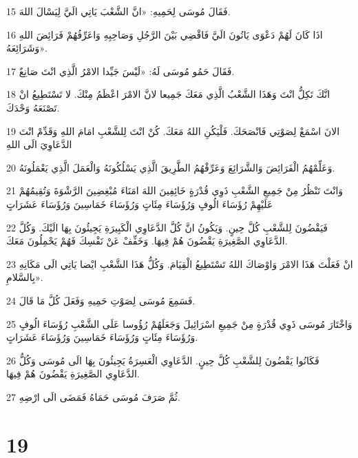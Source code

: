 \par 15 فَقَالَ مُوسَى لِحَمِيهِ: «انَّ الشَّعْبَ يَاتِي الَيَّ لِيَسْالَ اللهَ.
\par 16 اذَا كَانَ لَهُمْ دَعْوَى يَاتُونَ الَيَّ فَاقْضِي بَيْنَ الرَّجُلِ وَصَاحِبِهِ وَاعَرِّفُهُمْ فَرَائِضَ اللهِ وَشَرَائِعَهُ».
\par 17 فَقَالَ حَمُو مُوسَى لَهُ: «لَيْسَ جَيِّدا الامْرُ الَّذِي انْتَ صَانِعٌ.
\par 18 انَّكَ تَكِلُّ انْتَ وَهَذَا الشَّعْبُ الَّذِي مَعَكَ جَمِيعا لانَّ الامْرَ اعْظَمُ مِنْكَ. لا تَسْتَطِيعُ انْ تَصْنَعَهُ وَحْدَكَ.
\par 19 الانَ اسْمَعْ لِصَوْتِي فَانْصَحَكَ. فَلْيَكُنِ اللهُ مَعَكَ. كُنْ انْتَ لِلشَّعْبِ امَامَ اللهِ وَقَدِّمْ انْتَ الدَّعَاوِيَ الَى اللهِ
\par 20 وَعَلِّمْهُمُ الْفَرَائِضَ وَالشَّرَائِعَ وَعَرِّفْهُمُ الطَّرِيقَ الَّذِي يَسْلُكُونَهُ وَالْعَمَلَ الَّذِي يَعْمَلُونَهُ.
\par 21 وَانْتَ تَنْظُرُ مِنْ جَمِيعِ الشَّعْبِ ذَوِي قُدْرَةٍ خَائِفِينَ اللهَ امَنَاءَ مُبْغِضِينَ الرَّشْوَةَ وَتُقِيمُهُمْ عَلَيْهِمْ رُؤَسَاءَ الُوفٍ وَرُؤَسَاءَ مِئَاتٍ وَرُؤَسَاءَ خَمَاسِينَ وَرُؤَسَاءَ عَشَرَاتٍ
\par 22 فَيَقْضُونَ لِلشَّعْبِ كُلَّ حِينٍ. وَيَكُونُ انَّ كُلَّ الدَّعَاوِي الْكَبِيرَةِ يَجِيئُونَ بِهَا الَيْكَ. وَكُلَّ الدَّعَاوِي الصَّغِيرَةِ يَقْضُونَ هُمْ فِيهَا. وَخَفِّفْ عَنْ نَفْسِكَ فَهُمْ يَحْمِلُونَ مَعَكَ.
\par 23 انْ فَعَلْتَ هَذَا الامْرَ وَاوْصَاكَ اللهُ تَسْتَطِيعُ الْقِيَامَ. وَكُلُّ هَذَا الشَّعْبِ ايْضا يَاتِي الَى مَكَانِهِ بِالسَّلامِ».
\par 24 فَسَمِعَ مُوسَى لِصَوْتِ حَمِيهِ وَفَعَلَ كُلَّ مَا قَالَ.
\par 25 وَاخْتَارَ مُوسَى ذَوِي قُدْرَةٍ مِنْ جَمِيعِ اسْرَائِيلَ وَجَعَلَهُمْ رُؤُوسا عَلَى الشَّعْبِ رُؤَسَاءَ الُوفٍ وَرُؤَسَاءَ مِئَاتٍ وَرُؤَسَاءَ خَمَاسِينَ وَرُؤَسَاءَ عَشَرَاتٍ.
\par 26 فَكَانُوا يَقْضُونَ لِلشَّعْبِ كُلَّ حِينٍ. الدَّعَاوِي الْعَسِرَةُ يَجِيئُونَ بِهَا الَى مُوسَى وَكُلُّ الدَّعَاوِي الصَّغِيرَةِ يَقْضُونَ هُمْ فِيهَا.
\par 27 ثُمَّ صَرَفَ مُوسَى حَمَاهُ فَمَضَى الَى ارْضِهِ.

\chapter{19}

